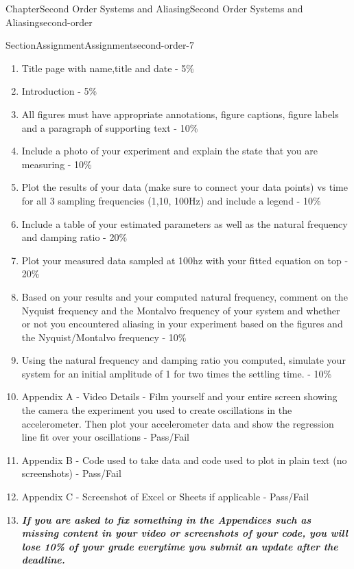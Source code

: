 \documentclass[oneside,10pt,]{book}
\newcommand{\alert}[1]{\textbf{\textit{#1}}}
\numberwithin{equation}{section}
\begin{document}
\begin{chapterptx}{Chapter}{Second Order Systems and Aliasing}{}{Second Order Systems and Aliasing}{}{}{second-order}
\begin{sectionptx}{Section}{Assignment}{}{Assignment}{}{}{second-order-7}
\begin{introduction}{}
%
\begin{enumerate}
\item{}Title page with name,title and date - 5\%%
\item{}Introduction - 5\%%
\item{}All figures must have appropriate annotations, figure captions, figure labels and a paragraph of supporting text - 10\%%
\item{}Include a photo of your experiment and explain the state that you are measuring - 10\%%
\item{}Plot the results of your data (make sure to connect your data points) vs time for all 3 sampling frequencies (1,10, 100Hz) and include a legend - 10\%%
\item{}Include a table of your estimated parameters as well as the natural frequency and damping ratio - 20\%%
\item{}Plot your measured data sampled at 100hz with your fitted equation on top - 20\%%
\item{}Based on your results and your computed natural frequency, comment on the Nyquist frequency and the Montalvo frequency of your system and whether or not you encountered aliasing in your experiment based on the figures and the Nyquist\slash{}Montalvo frequency - 10\%%
\item{}Using the natural frequency and damping ratio you computed, simulate your system for an initial amplitude of 1 for two times the settling time. - 10\%%
\item{}Appendix A - Video Details - Film yourself and your entire screen showing the camera the experiment you used to create oscillations in the accelerometer. Then plot your accelerometer data and show the regression line fit over your oscillations - Pass\slash{}Fail%
\item{}Appendix B - Code used to take data and code used to plot in plain text (no screenshots) - Pass\slash{}Fail%
\item{}Appendix C - Screenshot of Excel or Sheets if applicable - Pass\slash{}Fail%
\item{}\alert{If you are asked to fix something in the Appendices such as missing content in your video or screenshots of your code, you will lose 10\% of your grade everytime you submit an update after the deadline.}%
\end{enumerate}
\end{introduction}%
\end{sectionptx}
\end{chapterptx}
%
%
\typeout{************************************************}
\end{document}
